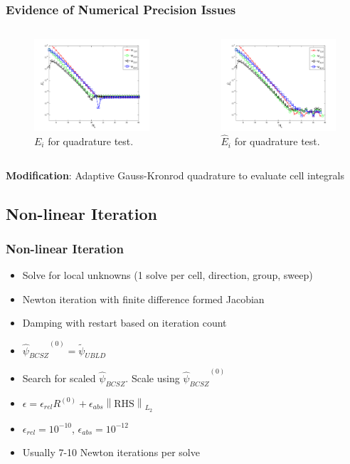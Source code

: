 \documentclass{beamer}
\newcommand{\norm}[1]{\ensuremath{\left\lVert #1 \right\rVert}}  %
\newcommand{\BCSZH}{\ensuremath{\widehat{\psi}_{BCSZ}}}
\begin{document}
\begin{frame}
\frametitle{Evidence of Numerical Precision Issues}
\vspace{-.75in}
\begin{columns}[t]
\begin{figure}[h]
\centering
		\includegraphics[width=2.25in]{err_gauss_to_matlab_exact.png}
		\caption{$E_i$ for quadrature test.}
		\label{fig:quad_err}
\end{figure}

\begin{figure}
\centering
		\includegraphics[width=2.25in]{err_gauss_to_highest_gauss.png}
		\caption{$\widehat{E}_i$ for quadrature test.}
		\label{fig:no_err}
\end{figure}
\end{columns}
\vspace{0.1in}
{\bf Modification}: Adaptive Gauss-Kronrod quadrature to evaluate cell integrals
\end{frame}

\subsection{Non-linear Iteration}
\begin{frame}
\frametitle{Non-linear Iteration}
\begin{itemize}
\item Solve for local unknowns (1 solve per cell, direction, group, sweep)
\item Newton iteration with finite difference formed Jacobian

\item Damping with restart based on iteration count
\item $\BCSZH^{(0)} = \widetilde{\psi}_{UBLD}$
\item Search for scaled \BCSZH.  Scale using $\BCSZH^{(0)}$
\item $\epsilon = \epsilon_{rel} R^{(0)} + \epsilon_{abs} \norm{\text{RHS}}_{L_2}$
\item $\epsilon_{rel} = 10^{-10}$, $\epsilon_{abs} = 10^{-12}$
\item Usually 7-10 Newton iterations per solve
\end{itemize}
\end{frame}
\end{document}
